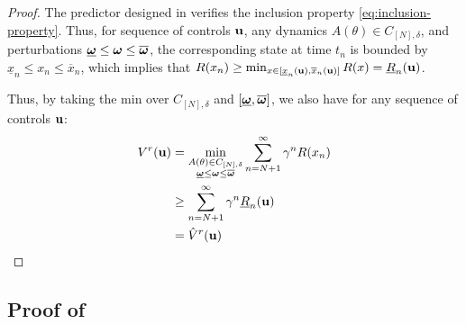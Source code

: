 \documentclass{article}
\begin{document}
\begin{proof}
	The predictor designed in  verifies the inclusion property \eqref{eq:inclusion-property}. Thus, for sequence of controls $\mathbf{u}$, any dynamics $A(\theta)\in C_{[N],\delta}$, and perturbations $\underline{\bm{\omega}} \leq \bm{\omega} \leq \overline{\bm{\omega}}$, the corresponding state at time $t_n$ is bounded by $\underline{x}_n \leq x_n \leq \overline{x}_n$, which implies that $R(x_n) \geq \min_{x\in[\underline{x}_n(\mathbf{u}), \overline{x}_n(\mathbf{u})]}  R(x) = \underline{R}_n(\mathbf{u})$.
	
	Thus, by taking the min over $C_{[N],\delta}$ and $[\underline{\bm{\omega}}, \overline{\bm{\omega}}]$, we also have for any sequence of controls $\mathbf{u}$:
	\begin{align*}
	    V^r(\mathbf{u}) &= \min_{\substack{A(\theta)\in C_{[N],\delta}\\ \underline{\bm{\omega}} \leq \bm{\omega} \leq \overline{\bm{\omega}}}} \sum_{n=N+1}^\infty \gamma^n R(x_n)\\
	    &\geq \sum_{n=N+1}^\infty \gamma^n \underline{R}_n(\mathbf{u})\\
	    &= \hat{V}^r(\mathbf{u})
	\end{align*}
\end{proof}

\subsection{Proof of }
\end{document}
